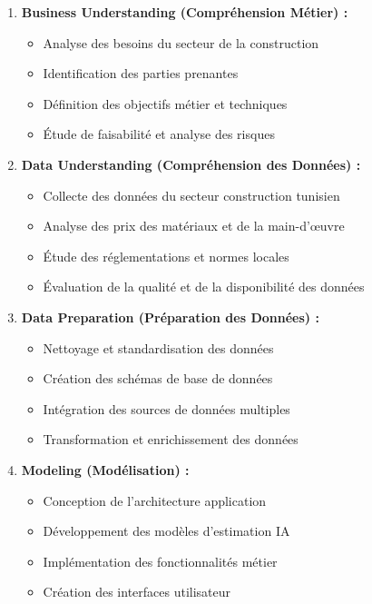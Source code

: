 \documentclass[12pt, a4paper]{report}
\begin{document}
\begin{enumerate}
    \item \textbf{Business Understanding (Compréhension Métier) :}
    \begin{itemize}
        \item Analyse des besoins du secteur de la construction
        \item Identification des parties prenantes
        \item Définition des objectifs métier et techniques
        \item Étude de faisabilité et analyse des risques
    \end{itemize}
    
    \item \textbf{Data Understanding (Compréhension des Données) :}
    \begin{itemize}
        \item Collecte des données du secteur construction tunisien
        \item Analyse des prix des matériaux et de la main-d'œuvre
        \item Étude des réglementations et normes locales
        \item Évaluation de la qualité et de la disponibilité des données
    \end{itemize}
    
    \item \textbf{Data Preparation (Préparation des Données) :}
    \begin{itemize}
        \item Nettoyage et standardisation des données
        \item Création des schémas de base de données
        \item Intégration des sources de données multiples
        \item Transformation et enrichissement des données
    \end{itemize}
    
    \item \textbf{Modeling (Modélisation) :}
    \begin{itemize}
        \item Conception de l'architecture application
        \item Développement des modèles d'estimation IA
        \item Implémentation des fonctionnalités métier
        \item Création des interfaces utilisateur
    \end{itemize}
    

\end{enumerate}
\end{document}
